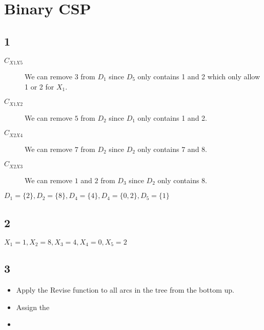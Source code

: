 \section{Binary CSP}
\subsection{1}


\begin{description}
	\item[$C_{X1X5}$] We can remove $3$ from $D_{1}$ since $D_5$ only contains 1 and 2 which only allow 1 or 2 for $X_1$.
	\item[$C_{X1X2}$] We can remove $5$ from $D_{2}$ since $D_1$ only contains 1 and 2.
	\item[$C_{X2X4}$] We can remove $7$ from $D_{2}$ since $D_2$ only contains 7 and 8.
	\item[$C_{X2X3}$] We can remove $1$ and $2$ from $D_{3}$ since $D_2$ only contains 8.
\end{description}


$D_1 = \{2\}, D_2 = \{8\}, D_4 = \{4\}, D_4 = \{0, 2\}, D_5 = \{1\}$
\subsection{2}


$X_1 = 1, X_2 = 8, X_3 = 4, X_4 = 0, X_5 = 2$

\subsection{3}
\begin{itemize}
	\item Apply the Revise function to all arcs in the tree from the bottom up.
	\item Assign the
	\item
\end{itemize}